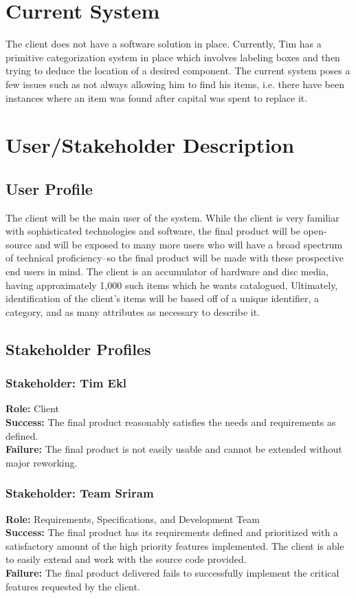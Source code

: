 \documentclass{article}
\begin{document}
\section{Current System}
The client does not have a software solution in place.  Currently, Tim has a primitive categorization system in place which involves labeling boxes and then trying to deduce the location of a desired component.  The current system poses a few issues such as not always allowing him to find his items, i.e. there have been instances where an item was found after capital was spent to replace it.

\section{User/Stakeholder Description}

\subsection{User Profile}
The client will be the main user of the system. While the client is very familiar with sophisticated technologies and software, the final product will be open-source and will be exposed to many more users who will have a broad spectrum of technical proficiency--so the final product will be made with these prospective end users in mind. The client is an accumulator of hardware and disc media, having approximately 1,000 such items which he wants catalogued. Ultimately, identification of the client's items will be based off of a unique identifier, a category, and as many attributes as necessary to describe it.

\subsection{Stakeholder Profiles}

\subsubsection{Stakeholder: Tim Ekl}
\textbf{Role:} Client\\
\textbf{Success:} The final product reasonably satisfies the needs and requirements as defined.\\
\textbf{Failure:} The final product is not easily usable and cannot be extended without major reworking.

\subsubsection{Stakeholder: Team Sriram}
\textbf{Role:} Requirements, Specifications, and Development Team\\
\textbf{Success:} The final product has its requirements defined and prioritized with a satisfactory amount of the high priority features implemented.  The client is able to easily extend and work with the source code provided.\\
\textbf{Failure:} The final product delivered fails to successfully implement the critical features requested by the client.
\end{document}

